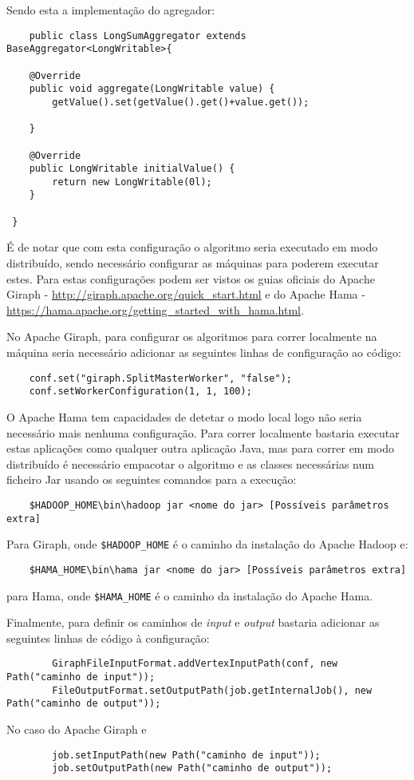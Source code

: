 	Sendo esta a implementação do agregador:
	\begin{verbatim}
	public class LongSumAggregator extends BaseAggregator<LongWritable>{

	@Override
	public void aggregate(LongWritable value) {
		getValue().set(getValue().get()+value.get());
		
	}

	@Override
	public LongWritable initialValue() {
		return new LongWritable(0l);
	}

 }
	\end{verbatim}
	É de notar que com esta configuração o algoritmo seria executado em modo distribuído, sendo necessário configurar as máquinas para poderem executar estes. Para estas configurações podem ser vistos os guias oficiais do Apache Giraph - \url{http://giraph.apache.org/quick_start.html} e do Apache Hama - \url{https://hama.apache.org/getting_started_with_hama.html}.
	
	No Apache Giraph, para configurar os algoritmos para correr localmente na máquina seria necessário adicionar as seguintes linhas de configuração ao código:
	\begin{verbatim}
	conf.set("giraph.SplitMasterWorker", "false");
	conf.setWorkerConfiguration(1, 1, 100);
	\end{verbatim}
	
	O Apache Hama tem capacidades de detetar o modo local logo não seria necessário mais nenhuma configuração.
	\linebreak
	Para correr localmente bastaria executar estas aplicações como qualquer outra aplicação Java, mas para correr em modo distribuído é necessário empacotar o algoritmo e as classes necessárias num ficheiro Jar usando os seguintes comandos para a execução:
	\begin{verbatim}
	$HADOOP_HOME\bin\hadoop jar <nome do jar> [Possíveis parâmetros extra]
	\end{verbatim}
	Para Giraph, onde \verb|$HADOOP_HOME| é o caminho da instalação do Apache Hadoop e: 
	
	\begin{verbatim}
	$HAMA_HOME\bin\hama jar <nome do jar> [Possíveis parâmetros extra]
	\end{verbatim}
	para Hama, onde \verb|$HAMA_HOME| é o caminho da instalação do Apache Hama.
	
	Finalmente, para definir os caminhos de \textit{input} e \textit{output} bastaria adicionar as seguintes linhas de código à configuração:
	\begin{verbatim}
		GiraphFileInputFormat.addVertexInputPath(conf, new Path("caminho de input"));
		FileOutputFormat.setOutputPath(job.getInternalJob(), new Path("caminho de output"));
	\end{verbatim}
	No caso do Apache Giraph e
	\begin{verbatim}
		job.setInputPath(new Path("caminho de input"));
		job.setOutputPath(new Path("caminho de output"));
	\end{verbatim}
	
